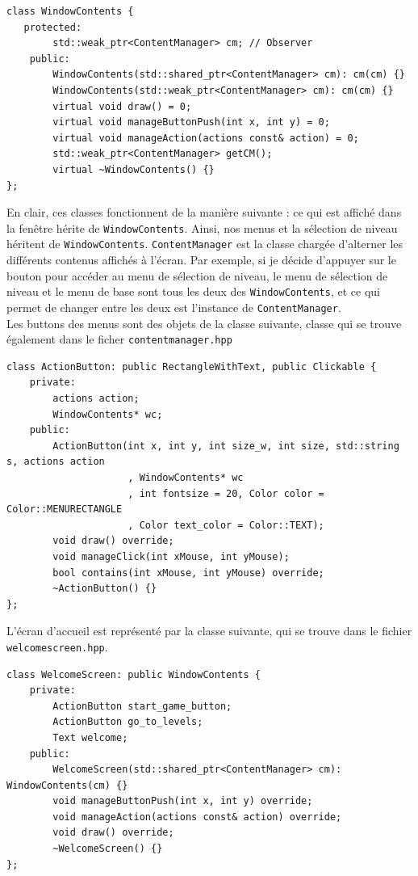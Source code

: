 \documentclass[a4paper, 12pt]{article}
\begin{document}
\begin{lstlisting}
class WindowContents {
   protected:
        std::weak_ptr<ContentManager> cm; // Observer
    public:
        WindowContents(std::shared_ptr<ContentManager> cm): cm(cm) {}
        WindowContents(std::weak_ptr<ContentManager> cm): cm(cm) {}
        virtual void draw() = 0;
        virtual void manageButtonPush(int x, int y) = 0;
        virtual void manageAction(actions const& action) = 0;
        std::weak_ptr<ContentManager> getCM();
        virtual ~WindowContents() {}
};
\end{lstlisting}

\pagebreak

En clair, 
ces classes fonctionnent de la manière suivante : 
ce qui est affiché dans la fenêtre hérite de \texttt{WindowContents}. 
Ainsi, nos menus et la sélection de niveau héritent de \texttt{WindowContents}. 
\texttt{ContentManager} est la classe chargée d'alterner les différents contenus 
affichés à l'écran. 
Par exemple, si je décide d'appuyer sur le bouton pour accéder au menu de sélection 
de niveau, le menu de sélection de niveau et le menu de base sont tous les deux 
des \texttt{WindowContents}, 
et ce qui permet de changer entre les deux est l'instance de \texttt{ContentManager}.\\

Les buttons des menus sont des objets de la classe suivante, 
classe qui se trouve également dans le ficher \texttt{content\textunderscore manager.hpp}

\begin{lstlisting}
class ActionButton: public RectangleWithText, public Clickable {
    private:
        actions action;
        WindowContents* wc;
    public:
        ActionButton(int x, int y, int size_w, int size, std::string s, actions action
                     , WindowContents* wc
                     , int fontsize = 20, Color color = Color::MENURECTANGLE
                     , Color text_color = Color::TEXT);
        void draw() override;
        void manageClick(int xMouse, int yMouse);
        bool contains(int xMouse, int yMouse) override;
        ~ActionButton() {}
};
\end{lstlisting}

L'écran d'accueil est représenté par la classe suivante,
qui se trouve dans le fichier \texttt{welcome\textunderscore screen.hpp}.

\begin{lstlisting}
class WelcomeScreen: public WindowContents {
    private:
        ActionButton start_game_button;
        ActionButton go_to_levels;
        Text welcome;
    public:
        WelcomeScreen(std::shared_ptr<ContentManager> cm): WindowContents(cm) {}
        void manageButtonPush(int x, int y) override;
        void manageAction(actions const& action) override;
        void draw() override;
        ~WelcomeScreen() {}
};
\end{lstlisting}
\end{document}
